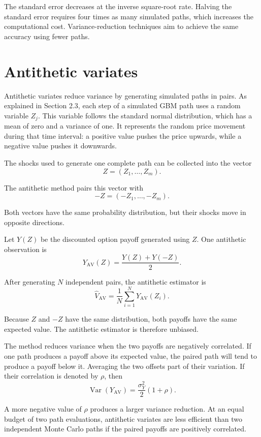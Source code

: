 The standard error decreases at the inverse square-root rate. Halving the standard error requires four times as many simulated paths, which increases the computational cost. Variance-reduction techniques aim to achieve the same accuracy using fewer paths.

\section{Antithetic variates}

Antithetic variates reduce variance by generating simulated paths in pairs. As explained in Section 2.3, each step of a simulated GBM path uses a random variable \(Z_j\). This variable follows the standard normal distribution, which has a mean of zero and a variance of one. It represents the random price movement during that time interval: a positive value pushes the price upwards, while a negative value pushes it downwards.

The shocks used to generate one complete path can be collected into the vector
\[
Z=(Z_1,\ldots,Z_m).
\]

The antithetic method pairs this vector with
\[
-Z=(-Z_1,\ldots,-Z_m).
\]

Both vectors have the same probability distribution, but their shocks move in opposite directions.

Let \(Y(Z)\) be the discounted option payoff generated using \(Z\). One antithetic observation is
\[
Y_{\mathrm{AV}}(Z)
=
\frac{Y(Z)+Y(-Z)}{2}.
\]

After generating \(N\) independent pairs, the antithetic estimator is
\[
\widehat{V}_{\mathrm{AV}}
=
\frac{1}{N}
\sum_{i=1}^{N}
Y_{\mathrm{AV}}(Z_i).
\]

Because \(Z\) and \(-Z\) have the same distribution, both payoffs have the same expected value. The antithetic estimator is therefore unbiased.

The method reduces variance when the two payoffs are negatively correlated. If one path produces a payoff above its expected value, the paired path will tend to produce a payoff below it. Averaging the two offsets part of their variation. If their correlation is denoted by \(\rho\), then
\[
\operatorname{Var}
\left(
Y_{\mathrm{AV}}
\right)
=
\frac{\sigma_Y^2}{2}(1+\rho).
\]

A more negative value of \(\rho\) produces a larger variance reduction. At an equal budget of two path evaluations, antithetic variates are less efficient than two independent Monte Carlo paths if the paired payoffs are positively correlated.

